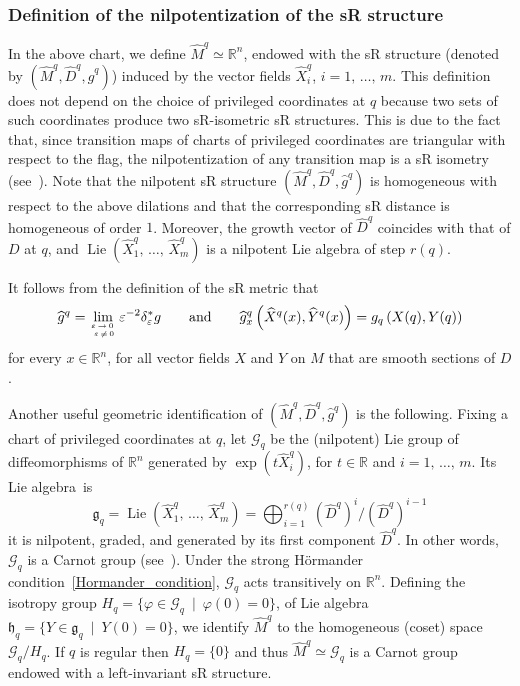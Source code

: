 \documentclass[AHL,Unicode,published]{cedram}
\newcommand*\R{\mathbb{R}}
\newcommand{\calG}{\mathcal{G}}
\newcommand{\frkg}{\mathfrak{g}}
\newcommand{\frkh}{\mathfrak{h}}
\DeclareMathOperator{\Lie}{Lie}
\begin{document}
\subsubsection{Definition of the nilpotentization of the sR structure}\label{sec_def_nilpotentization}
In the above chart, we define $\widehat{M}^{q}\simeq\R^n$, endowed with the sR structure (denoted by $(\widehat{M}^{q},\widehat{D}^{q},\widehat{g}^{q})$) induced by the vector fields $\widehat{X}^{q}_i$, $i=1,\,\ldots,\,m$. This definition does not depend on the choice of privileged coordinates at $q$ because two sets of such coordinates produce two sR-isometric sR structures. This is due to the fact that, since transition maps of charts of privileged coordinates are triangular with respect to the flag, the nilpotentization of any transition map is a sR isometry (see~\cite[Proposition~5.20]{Bellaiche}). Note that the nilpotent sR structure $(\widehat{M}^{q},\widehat{D}^{q},\widehat{g}^{q})$ is homogeneous with respect to the above dilations and that the corresponding sR distance is homogeneous of order $1$. Moreover, the growth vector of $\widehat{D}^{q}$ coincides with that of $D$ at $q$, and $\Lie(\widehat{X}^{q}_1,\,\ldots,\,\widehat{X}^{q}_m)$ is a nilpotent Lie algebra of step $r(q)$.

It follows from the definition of the sR metric that
\[
\widehat{g}^{q} = \lim_{\varepsilon\,\rightarrow\,0\,\atop \,\varepsilon\,\neq\,0} \varepsilon^{-2} \delta_\varepsilon^* g
\qquad \text{and}\qquad
\widehat{g}^{q}_x\left(\widehat{X}^{q}(x),\widehat{Y}^{q}(x)\right) = g_{q}\left(X(q),Y(q)\right)
\]
for every $x\in\R^n$, for all vector fields $X$ and $Y$ on $M$ that are smooth sections of $D$.

Another useful geometric identification of $(\widehat{M}^{q},\widehat{D}^{q},\widehat{g}^{q})$ is the following. Fixing a chart of privileged coordinates at $q$, let $\calG_{q}$ be the (nilpotent) Lie group of diffeomorphisms of $\R^n$ generated by $\exp(t\widehat{X}^{q}_i)$, for $t\in\R$ and $i=1,\,\ldots,\,m$. Its Lie algebra~is
\[
\frkg_{q} = \Lie\left(\widehat{X}^{q}_1,\,\ldots,\,\widehat{X}^{q}_m\right) = \bigoplus_{i=1}^{r(q)} \left(\widehat{D}^{q} \right)^i / \left(\widehat{D}^{q} \right)^{i-1}
\]
it is nilpotent, graded, and generated by its first component $\widehat{D}^{q}$. In other words, $\calG_{q}$ is a Carnot group (see~\cite{Mo-02}). Under the strong H\"ormander condition~\eqref{Hormander_condition}, $\calG_{q}$ acts transitively on $\R^n$. Defining the isotropy group $H_{q}=\{\varphi\in \calG_{q}\ \mid\ \varphi(0)=0\}$, of Lie algebra $\frkh_{q}=\{Y\in \frkg_{q}\ \mid\ Y(0)=0\}$, we identify $\widehat{M}^{q}$ to the homogeneous (coset) space $\calG_{q}/H_{q}$. If $q$ is regular then $H_{q}=\{0\}$ and thus $\widehat{M}^{q}\simeq \calG_{q}$ is a Carnot group endowed with a left-invariant sR structure.
\end{document}
